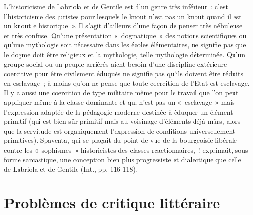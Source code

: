 \documentclass[french,twoside]{book} %
\newcommand\chapteropen{} %
\newcommand\chaptercont{} %
\newcommand\chapterclose{} %
\begin{document}
\noindent L'historicisme de Labriola et de Gentile est d’un genre très inférieur : c’est l’historicisme des juristes pour lesquels le knout n’est pas un knout quand il est un knout e historique ». Il s’agit d’ailleurs d’une façon de penser très nébuleuse et très confuse. Qu'une présentation « dogmatique » des notions scientifiques ou qu’une mythologie soit nécessaire dans les écoles élémentaires, ne signifie pas que le dogme doit être religieux et la mythologie, telle mythologie déterminée. Qu'un groupe social ou un peuple arriérés aient besoin d’une discipline extérieure coercitive pour être civilement éduqués ne signifie pas qu’ils doivent être réduits en esclavage ; à moins qu’on ne pense que toute coercition de l’Etat est esclavage. Il y a aussi une coercition de type militaire même pour le travail que l’on peut appliquer même à la classe dominante et qui n’est pas un « esclavage » mais l’expression adaptée de la pédagogie moderne destinée à éduquer un élément primitif (qui est bien sûr primitif mais au voisinage d’éléments déjà mûrs, alors que la servitude est organiquement l’expression de conditions universellement primitives). Spaventa, qui se plaçait du point de vue de la bourgeoisie libérale contre les « sophismes » historicistes des classes réactionnaires, ! exprimait, sous forme sarcastique, une conception bien plus progressiste et dialectique que celle de Labriola et de Gentile (Int., pp. 116-118).\par
{\raggedleft \noindent [1932-1933]}
\chapterclose


\chapteropen
\chapter[{Problèmes de critique littéraire}]{Problèmes de critique littéraire}\renewcommand{\leftmark}{Problèmes de critique littéraire}


\chaptercont
\end{document}
